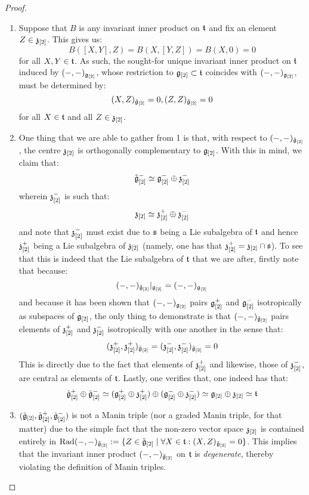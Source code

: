             \begin{proof}
                \begin{enumerate}
                    \item Suppose that $B$ is any invariant inner product on $\mathfrak{t}$ and fix an element $Z \in \mathfrak{z}_{[2]}$. This gives us:
                        $$B([X, Y], Z) = B(X, [Y, Z]) = B(X, 0) = 0$$
                    for all $X, Y \in \mathfrak{t}$. As such, the sought-for unique invariant inner product on $\mathfrak{t}$ induced by $(-, -)_{\mathfrak{g}_{[2]}}$, whose restriction to $\mathfrak{g}_{[2]} \subset \mathfrak{t}$ coincides with $(-, -)_{\mathfrak{g}_{[2]}}$, must be determined by:
                        $$(X, Z)_{\tilde{\mathfrak{g}}_{[2]}} = 0, (Z, Z)_{\tilde{\mathfrak{g}}_{[2]}} = 0$$
                    for all $X \in \mathfrak{t}$ and all $Z \in \mathfrak{z}_{[2]}$.
                    \item One thing that we are able to gather from 1 is that, with respect to $(-, -)_{\tilde{\mathfrak{g}}_{[2]}}$, the centre $\mathfrak{z}_{[2]}$ is orthogonally complementary to $\mathfrak{g}_{[2]}$. With this in mind, we claim that:
                        $$\tilde{\mathfrak{g}}_{[2]}^- \simeq \mathfrak{g}_{[2]}^- \oplus \mathfrak{z}_{[2]}^-$$
                    wherein $\mathfrak{z}_{[2]}^-$ is such that:
                        $$\mathfrak{z}_{[2]} \simeq \mathfrak{z}_{[2]}^+ \oplus \mathfrak{z}_{[2]}^-$$
                    and note that $\mathfrak{z}_{[2]}^-$ must exist due to $\mathfrak{s}$ being a Lie subalgebra of $\mathfrak{t}$ and hence $\mathfrak{z}_{[2]}^+$ being a Lie subalgebra of $\mathfrak{z}_{[2]}$ (namely, one has that $\mathfrak{z}_{[2]}^+ = \mathfrak{z}_{[2]} \cap \mathfrak{s}$). To see that this is indeed that the Lie subalgebra of $\mathfrak{t}$ that we are after, firstly note that because:
                        $$(-, -)_{\tilde{\mathfrak{g}}_{[2]}}|_{\mathfrak{g}_{[2]}} = (-, -)_{\mathfrak{g}_{[2]}}$$
                    and because it has been shown that $(-, -)_{\mathfrak{g}_{[2]}}$ pairs $\mathfrak{g}_{[2]}^+$ and $\mathfrak{g}_{[2]}^-$ isotropically as subspaces of $\mathfrak{g}_{[2]}$, the only thing to demonstrate is that $(-, -)_{\tilde{\mathfrak{g}}_{[2]}}$ pairs elements of $\mathfrak{z}_{[2]}^+$ and $\mathfrak{z}_{[2]}^-$ isotropically with one another in the sense that:
                        $$(\mathfrak{z}_{[2]}^+, \mathfrak{z}_{[2]}^+)_{\tilde{\mathfrak{g}}_{[2]}} = (\mathfrak{z}_{[2]}^-, \mathfrak{z}_{[2]}^-)_{\tilde{\mathfrak{g}}_{[2]}} = 0$$
                    This is directly due to the fact that elements of $\mathfrak{z}_{[2]}^+$ and likewise, those of $\mathfrak{z}_{[2]}^-$, are central as elements of $\mathfrak{t}$. Lastly, one verifies that, one indeed has that:
                        $$\tilde{\mathfrak{g}}_{[2]}^+\oplus \tilde{\mathfrak{g}}_{[2]}^- \simeq ( \mathfrak{g}_{[2]}^+ \oplus \mathfrak{z}_{[2]}^+ ) \oplus ( \mathfrak{g}_{[2]}^- \oplus \mathfrak{z}_{[2]}^- ) \simeq \mathfrak{g}_{[2]} \oplus \mathfrak{z}_{[2]} \simeq \mathfrak{t}$$
                    \item $(\tilde{\mathfrak{g}}_{[2]}, \tilde{\mathfrak{g}}_{[2]}^+, \tilde{\mathfrak{g}}_{[2]}^-)$ is not a Manin triple (nor a graded Manin triple, for that matter) due to the simple fact that the non-zero vector space $\mathfrak{z}_{[2]}$ is contained entirely in $\operatorname{Rad} (-, -)_{\tilde{\mathfrak{g}}_{[2]}} := \{Z \in \tilde{\mathfrak{g}}_{[2]}\mid \forall X \in \mathfrak{t}: (X, Z)_{\tilde{\mathfrak{g}}_{[2]}} = 0\}$. This implies that the invariant inner product $(-, -)_{\tilde{\mathfrak{g}}_{[2]}}$ on $\mathfrak{t}$ is \textit{degenerate}, thereby violating the definition of Manin triples. 


\end{enumerate}
\end{proof}
